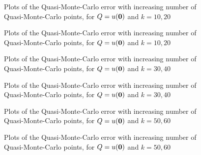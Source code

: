 \begin{figure}[h]
    \centering
    
    \caption{Plots of the Quasi-Monte-Carlo error with increasing number of Quasi-Monte-Carlo points, for $Q=u(\mathbf{0})$ and $k=10,20$ \label{fig:qmcorigin10}}
  \end{figure}
\begin{figure}[h]
  \centering

\caption{Plots of the Quasi-Monte-Carlo error with increasing number of Quasi-Monte-Carlo points, for $Q=u(\mathbf{0})$ and $k=10,20$ \label{fig:qmcorigin20}}
\end{figure}
\begin{figure}[h]
    \centering

    
    \caption{Plots of the Quasi-Monte-Carlo error with increasing number of Quasi-Monte-Carlo points, for $Q=u(\mathbf{0})$ and $k=30,40$ \label{fig:qmcorigin30}}
  \end{figure}
\begin{figure}[h]
  \centering

\caption{Plots of the Quasi-Monte-Carlo error with increasing number of Quasi-Monte-Carlo points, for $Q=u(\mathbf{0})$ and $k=30,40$ \label{fig:qmcorigin40}}
\end{figure}
\begin{figure}[h]
    \centering
    
    \caption{Plots of the Quasi-Monte-Carlo error with increasing number of Quasi-Monte-Carlo points, for $Q=u(\mathbf{0})$ and $k=50,60$ \label{fig:qmcorigin50}}
  \end{figure}
\begin{figure}[h]
  \centering

\caption{Plots of the Quasi-Monte-Carlo error with increasing number of Quasi-Monte-Carlo points, for $Q=u(\mathbf{0})$ and $k=50,60$ \label{fig:qmcorigin60}}
\end{figure}

